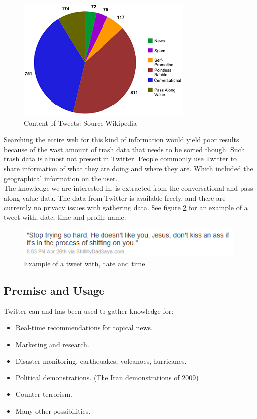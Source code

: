\documentclass[]{article}  %
\begin{document}
\begin{figure}[h]
\centering
\includegraphics[scale=1]{Content_of_Tweets_Graphed.png}
\caption{Content of Tweets: Source Wikipedia}
\label{figContent}
\end{figure}
 

Searching the entire web for this kind of information would yield poor results because of the wast amount of trash data that needs to be sorted though. Such trash data is almost not present in Twitter. People commonly use Twitter to share information of what they are doing and where they are. Which included the geographical information on the user.\\ The knowledge we are interested in, is extracted from the conversational and pass along value data. The data from Twitter is available freely, and there are currently no privacy issues with gathering data. See figure \ref{figTweet} for an example of a tweet with; date, time and profile name.

\begin{figure}[h]
\centering
\includegraphics[scale=1]{tweet.png}
\caption{Example of a tweet with, date and time}
\label{figTweet}
\end{figure}

\subsection{Premise and Usage}
Twitter can and has been used to gather knowledge for:

\begin{itemize}
	\item Real-time recommendations for topical news. \cite{bib5}
	\item Marketing and research.
	\item Disaster monitoring, earthquakes, volcanoes, hurricanes. \cite{bib7}
	\item Political demonstrations. (The Iran demonstrations of 2009)
	\item Counter-terrorism.
	\item Many other possibilities.
\end{itemize}
\end{document}
